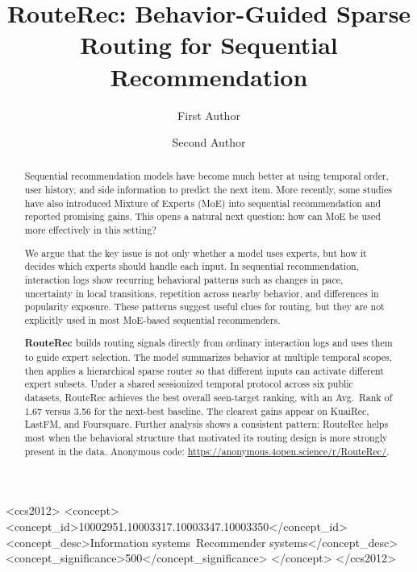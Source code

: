 \documentclass[sigconf,review,anonymous]{acmart}
\begin{document}
\title[RouteRec for Sequential Recommendation]{RouteRec: Behavior-Guided Sparse Routing for Sequential Recommendation}

\author{First Author}

\author{Second Author}

\renewcommand{\shortauthors}{Author et al.}

\begin{abstract}
Sequential recommendation models have become much better at using temporal order, user history, and side information to predict the next item. More recently, some studies have also introduced Mixture of Experts (MoE) into sequential recommendation and reported promising gains. This opens a natural next question: how can MoE be used more effectively in this setting?

We argue that the key issue is not only whether a model uses experts, but how it decides which experts should handle each input. In sequential recommendation, interaction logs show recurring behavioral patterns such as changes in pace, uncertainty in local transitions, repetition across nearby behavior, and differences in popularity exposure. These patterns suggest useful clues for routing, but they are not explicitly used in most MoE-based sequential recommenders.

\textbf{RouteRec} builds routing signals directly from ordinary interaction logs and uses them to guide expert selection. The model summarizes behavior at multiple temporal scopes, then applies a hierarchical sparse router so that different inputs can activate different expert subsets. Under a shared sessionized temporal protocol across six public datasets, RouteRec achieves the best overall seen-target ranking, with an Avg.~Rank of 1.67 versus 3.56 for the next-best baseline. The clearest gains appear on KuaiRec, LastFM, and Foursquare. Further analysis shows a consistent pattern: RouteRec helps most when the behavioral structure that motivated its routing design is more strongly present in the data. Anonymous code: \url{https://anonymous.4open.science/r/RouteRec/}.
\end{abstract}

\begin{CCSXML}
<ccs2012>
 <concept>
  <concept_id>10002951.10003317.10003347.10003350</concept_id>
  <concept_desc>Information systems~Recommender systems</concept_desc>
  <concept_significance>500</concept_significance>
 </concept>
</ccs2012>
\end{CCSXML}
\end{document}
